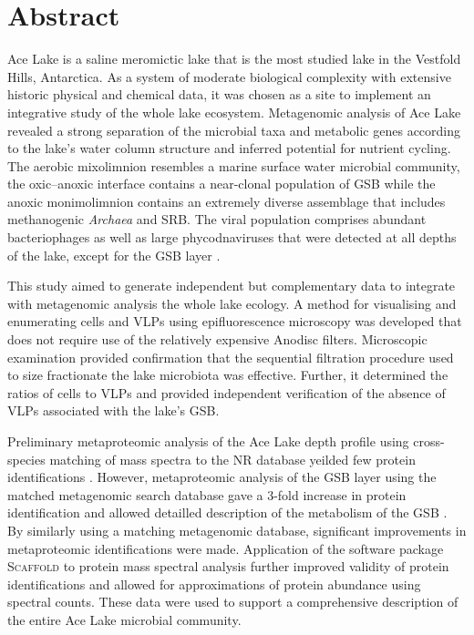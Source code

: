 \section{Abstract}
Ace Lake is a saline meromictic lake that is the most studied lake in the Vestfold Hills, Antarctica.
As a system of moderate biological complexity with extensive historic physical and chemical data, it was chosen as a site to implement an integrative study of the whole lake ecosystem.
Metagenomic analysis of Ace Lake revealed a strong separation of the microbial taxa and metabolic genes according to the lake's water column structure and inferred potential for nutrient cycling.
The aerobic mixolimnion resembles a marine surface water microbial community, the oxic--anoxic interface contains a near-clonal population of \ac{GSB} while the anoxic monimolimnion contains an extremely diverse assemblage that includes methanogenic \emph{Archaea} and \ac{SRB}.
The viral population comprises abundant bacteriophages as well as large phycodnaviruses that were detected at all depths of the lake, except for the \ac{GSB} layer \cite{Lauro2011}.

This study aimed to generate independent but complementary data to integrate with metagenomic analysis the whole lake ecology.
A method for visualising and enumerating cells and \acp{VLP} using epifluorescence microscopy was developed that does not require use of the relatively expensive Anodisc filters.
Microscopic examination provided confirmation that the sequential filtration procedure used to size fractionate the lake microbiota was effective. 
Further, it determined the ratios of cells to \acp{VLP} and provided independent verification of the absence of \acp{VLP} associated with the lake's \ac{GSB}.

Preliminary metaproteomic analysis of the Ace Lake depth profile using cross-species matching of mass spectra to the \ac{NR} database yeilded few protein identifications \cite{Ng2010b}.
However, metaproteomic analysis of the \ac{GSB} layer using the matched metagenomic search database gave a 3-fold increase in protein identification and allowed detailled description of the metabolism of the \ac{GSB} \cite{Ng2010a,Ng2010b}.
By similarly using a matching metagenomic database, significant improvements in metaproteomic identifications were made.
Application of the software package \textsc{Scaffold} to protein mass spectral analysis further improved validity of protein identifications and allowed for approximations of protein abundance using spectral counts.
These data were used to support a comprehensive description of the entire Ace Lake microbial community. 

